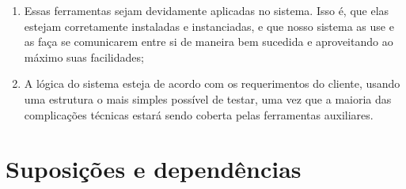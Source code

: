 \documentclass[11pt, a4paper]{article}
\begin{document}
        \begin{enumerate}
            \item Essas ferramentas sejam devidamente aplicadas no sistema.
            Isso é, que elas estejam corretamente instaladas e instanciadas,
            e que nosso sistema as use e as faça se comunicarem entre si de
            maneira bem sucedida e aproveitando ao máximo suas facilidades;

            \item A lógica do sistema esteja de acordo com os requerimentos do
            cliente, usando uma estrutura o mais simples possível de testar, uma
            vez que a maioria das complicações técnicas estará sendo coberta
            pelas ferramentas auxiliares.
        \end{enumerate}

    \section{Suposições e dependências}
\end{document}
